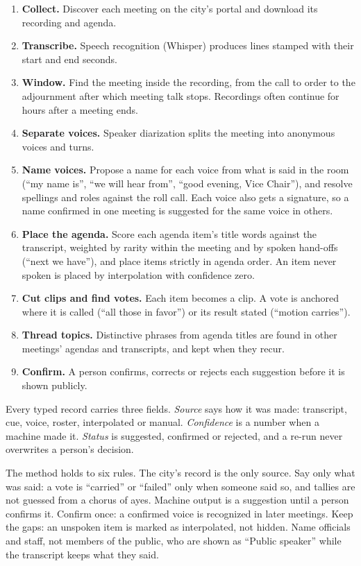 \documentclass[
  american,
  letterpaper,
  11pt]{article}
\providecommand{\tightlist}{%
  \setlength{\itemsep}{0pt}\setlength{\parskip}{0pt}}
\begin{document}
\begin{enumerate}
\def\labelenumi{\arabic{enumi}.}
\tightlist
\item
  \textbf{Collect.}
  Discover each meeting on the city's portal and download its recording and agenda.
\item
  \textbf{Transcribe.}
  Speech recognition (Whisper) produces lines stamped with their start and end seconds.
\item
  \textbf{Window.}
  Find the meeting inside the recording, from the call to order to the adjournment after which meeting talk stops.
  Recordings often continue for hours after a meeting ends.
\item
  \textbf{Separate voices.}
  Speaker diarization splits the meeting into anonymous voices and turns.
\item
  \textbf{Name voices.}
  Propose a name for each voice from what is said in the room (``my name is'', ``we will hear from'', ``good evening, Vice Chair''), and resolve spellings and roles against the roll call.
  Each voice also gets a signature, so a name confirmed in one meeting is suggested for the same voice in others.
\item
  \textbf{Place the agenda.}
  Score each agenda item's title words against the transcript, weighted by rarity within the meeting and by spoken hand-offs (``next we have''), and place items strictly in agenda order.
  An item never spoken is placed by interpolation with confidence zero.
\item
  \textbf{Cut clips and find votes.}
  Each item becomes a clip.
  A vote is anchored where it is called (``all those in favor'') or its result stated (``motion carries'').
\item
  \textbf{Thread topics.}
  Distinctive phrases from agenda titles are found in other meetings' agendas and transcripts, and kept when they recur.
\item
  \textbf{Confirm.}
  A person confirms, corrects or rejects each suggestion before it is shown publicly.
\end{enumerate}

Every typed record carries three fields.
\emph{Source} says how it was made: transcript, cue, voice, roster, interpolated or manual.
\emph{Confidence} is a number when a machine made it.
\emph{Status} is suggested, confirmed or rejected, and a re-run never overwrites a person's decision.

The method holds to six rules.
The city's record is the only source.
Say only what was said: a vote is ``carried'' or ``failed'' only when someone said so, and tallies are not guessed from a chorus of ayes.
Machine output is a suggestion until a person confirms it.
Confirm once: a confirmed voice is recognized in later meetings.
Keep the gaps: an unspoken item is marked as interpolated, not hidden.
Name officials and staff, not members of the public, who are shown as ``Public speaker'' while the transcript keeps what they said.
\end{document}
